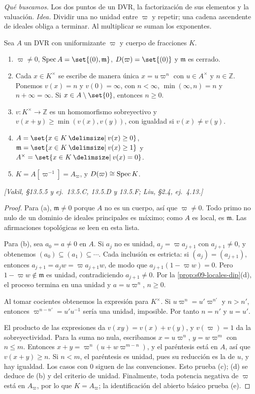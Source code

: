 \emph{Qué buscamos.} Los dos puntos de un DVR, la factorización de sus elementos y la valuación. \emph{Idea.} Dividir una no unidad entre $\varpi$ y repetir; una cadena ascendente de ideales obliga a terminar. Al multiplicar se suman los exponentes.

\begin{prop}
\label{prop:s09-estructura-dvr}
Sea $A$ un DVR con uniformizante $\varpi$ y cuerpo de fracciones $K$.
\begin{enumerate}[label=(\alph*)]
\item $\varpi\ne0$, $\Spec A=\set{(0),\mathfrak m}$, $D(\varpi)=\set{(0)}$ y $\mathfrak m$ es cerrado.
\item Cada $x\in K^\times$ se escribe de manera única $x=u\varpi^n$ con $u\in A^\times$ y $n\in\mathbb Z$. Ponemos $v(x)=n$ y $v(0)=\infty$, con $n<\infty$, $\min(\infty,n)=n$ y $n+\infty=\infty$. Si $x\in A\setminus\set{0}$, entonces $n\ge0$.
\item $v\colon K^\times\to\mathbb Z$ es un homomorfismo sobreyectivo y $v(x+y)\ge\min(v(x),v(y))$, con igualdad si $v(x)\ne v(y)$.
\item $A=\set{x\in K\given v(x)\ge0}$, $\mathfrak m=\set{x\in K\given v(x)\ge1}$ y $A^\times=\set{x\in K\given v(x)=0}$.
\item $K=A[\varpi^{-1}]=A_{\varpi}$, y $D(\varpi)\cong\operatorname{Spec} K$.
\end{enumerate}
\nopagebreak\emph{[Vakil, \S13.5.5 y ej.~13.5.C, 13.5.D y 13.5.F; Liu, \S2.4, ej.~4.13.]}
\end{prop}
\begin{proof}
Para (a), $\mathfrak m\ne0$ porque $A$ no es un cuerpo, así que $\varpi\ne0$. Todo primo no nulo de un dominio de ideales principales es máximo; como $A$ es local, es $\mathfrak m$. Las afirmaciones topológicas se leen en esta lista.

Para (b), sea $a_0=a\ne0$ en $A$. Si $a_j$ no es unidad, $a_j=\varpi a_{j+1}$ con $a_{j+1}\ne0$, y obtenemos $(a_0)\subseteq(a_1)\subseteq\cdots$. Cada inclusión es estricta: si $(a_j)=(a_{j+1})$, entonces $a_{j+1}=a_jw=\varpi a_{j+1}w$, de modo que $a_{j+1}(1-\varpi w)=0$. Pero $1-\varpi w\notin\mathfrak m$ es unidad, contradiciendo $a_{j+1}\ne0$. Por la \cref{prop:s09-locales-dip}(d), el proceso termina en una unidad y $a=u\varpi^n$, $n\ge0$.

Al tomar cocientes obtenemos la expresión para $K^\times$. Si $u\varpi^n=u'\varpi^{n'}$ y $n>n'$, entonces $\varpi^{n-n'}=u'u^{-1}$ sería una unidad, imposible. Por tanto $n=n'$ y $u=u'$.

El producto de las expresiones da $v(xy)=v(x)+v(y)$, y $v(\varpi)=1$ da la sobreyectividad. Para la suma no nula, escribamos $x=u\varpi^n$, $y=w\varpi^m$ con $n\le m$. Entonces $x+y=\varpi^n(u+w\varpi^{m-n})$, y el paréntesis está en $A$, así que $v(x+y)\ge n$. Si $n<m$, el paréntesis es unidad, pues su reducción es la de $u$, y hay igualdad. Los casos con $0$ siguen de las convenciones. Esto prueba (c); (d) se deduce de (b) y del criterio de unidad. Finalmente, toda potencia negativa de $\varpi$ está en $A_{\varpi}$, por lo que $K=A_{\varpi}$; la identificación del abierto básico prueba (e).
\end{proof}


